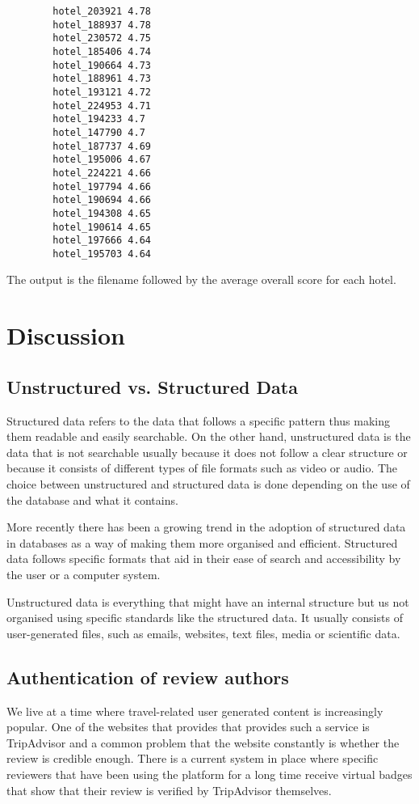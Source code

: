 \documentclass[titlepage]{article}
\begin{document}
        \begin{lstlisting}
        hotel_203921 4.78
        hotel_188937 4.78
        hotel_230572 4.75
        hotel_185406 4.74
        hotel_190664 4.73
        hotel_188961 4.73
        hotel_193121 4.72
        hotel_224953 4.71
        hotel_194233 4.7
        hotel_147790 4.7
        hotel_187737 4.69
        hotel_195006 4.67
        hotel_224221 4.66
        hotel_197794 4.66
        hotel_190694 4.66
        hotel_194308 4.65
        hotel_190614 4.65
        hotel_197666 4.64
        hotel_195703 4.64
        \end{lstlisting}
        
        The output is the filename followed by the average overall score for each hotel.
        
        \section{Discussion}
            \subsection{Unstructured vs. Structured Data}
            Structured data refers to the data that follows a specific pattern thus making them readable and easily searchable. On the other hand, unstructured data is the data that is not searchable usually because it does not follow a clear structure or because it consists of different types of file formats such as video or audio. The choice between unstructured and structured data is done depending on the use of the database and what it contains.
            
            More recently there has been a growing trend in the adoption of structured data in databases as a way of making them more organised and efficient. Structured data follows specific formats that aid in their ease of search and accessibility by the user or a computer system.
            
            Unstructured data is everything that might have an internal structure but us not organised using specific standards like the structured data. It usually consists of user-generated files, such as emails, websites, text files, media or scientific data.
            
            
            \subsection{Authentication of review authors}
            We live at a time where travel-related user generated content is increasingly popular. One of the websites that provides that provides such a service is TripAdvisor and a common problem that the website constantly is whether the review is credible enough. There is a current system in place where specific reviewers that have been using the platform for a long time receive virtual badges that show that their review is verified by TripAdvisor themselves.
            
\end{document}

